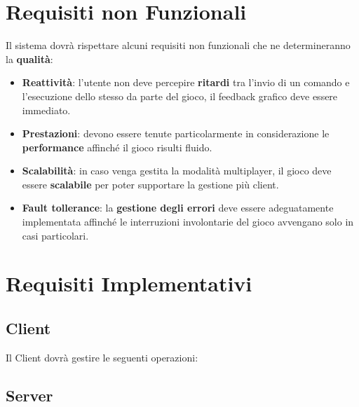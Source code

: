             
	\section{Requisiti non Funzionali}
        Il sistema dovrà rispettare alcuni requisiti non funzionali che ne determineranno la \textbf{qualità}:
        \begin{itemize}
            \item \textbf{Reattività}: l'utente non deve percepire \textbf{ritardi} tra l'invio di un comando e l'esecuzione dello stesso da parte del gioco, il feedback grafico deve essere immediato.
            
            \item \textbf{Prestazioni}: devono essere tenute particolarmente in considerazione le \textbf{performance} affinché il gioco risulti fluido.
            
            \item \textbf{Scalabilità}: in caso venga gestita la modalità multiplayer, il gioco deve essere \textbf{scalabile} per poter supportare la gestione più client.
            
            \item \textbf{Fault tollerance}: la \textbf{gestione degli errori} deve essere adeguatamente implementata affinché le interruzioni involontarie del gioco avvengano solo in casi particolari.
            

        \end{itemize}
	\section{Requisiti Implementativi}
	        \subsection{Client}
            Il Client dovrà gestire le seguenti operazioni:
        \subsection{Server}